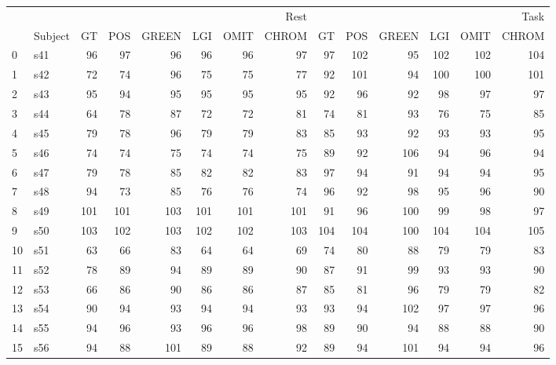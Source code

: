 \begin{tabular}{llrrrrrrrrrrrr}
\toprule
 &  & \multicolumn{6}{r}{Rest} & \multicolumn{6}{r}{Task} \\
 & Subject & GT & POS & GREEN & LGI & OMIT & CHROM & GT & POS & GREEN & LGI & OMIT & CHROM \\
\midrule
0 & s41 & 96 & 97 & 96 & 96 & 96 & 97 & 97 & 102 & 95 & 102 & 102 & 104 \\
1 & s42 & 72 & 74 & 96 & 75 & 75 & 77 & 92 & 101 & 94 & 100 & 100 & 101 \\
2 & s43 & 95 & 94 & 95 & 95 & 95 & 95 & 92 & 96 & 92 & 98 & 97 & 97 \\
3 & s44 & 64 & 78 & 87 & 72 & 72 & 81 & 74 & 81 & 93 & 76 & 75 & 85 \\
4 & s45 & 79 & 78 & 96 & 79 & 79 & 83 & 85 & 93 & 92 & 93 & 93 & 95 \\
5 & s46 & 74 & 74 & 75 & 74 & 74 & 75 & 89 & 92 & 106 & 94 & 96 & 94 \\
6 & s47 & 79 & 78 & 85 & 82 & 82 & 83 & 97 & 94 & 91 & 94 & 94 & 95 \\
7 & s48 & 94 & 73 & 85 & 76 & 76 & 74 & 96 & 92 & 98 & 95 & 96 & 90 \\
8 & s49 & 101 & 101 & 103 & 101 & 101 & 101 & 91 & 96 & 100 & 99 & 98 & 97 \\
9 & s50 & 103 & 102 & 103 & 102 & 102 & 103 & 104 & 104 & 100 & 104 & 104 & 105 \\
10 & s51 & 63 & 66 & 83 & 64 & 64 & 69 & 74 & 80 & 88 & 79 & 79 & 83 \\
11 & s52 & 78 & 89 & 94 & 89 & 89 & 90 & 87 & 91 & 99 & 93 & 93 & 90 \\
12 & s53 & 66 & 86 & 90 & 86 & 86 & 87 & 85 & 81 & 96 & 79 & 79 & 82 \\
13 & s54 & 90 & 94 & 93 & 94 & 94 & 93 & 93 & 94 & 102 & 97 & 97 & 96 \\
14 & s55 & 94 & 96 & 93 & 96 & 96 & 98 & 89 & 90 & 94 & 88 & 88 & 90 \\
15 & s56 & 94 & 88 & 101 & 89 & 88 & 92 & 89 & 94 & 101 & 94 & 94 & 96 \\
\bottomrule
\end{tabular}
